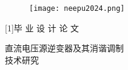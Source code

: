 \begin{center}

    \begin{figure}[h]
        \centering
        \vspace{2.6\baselineskip}
        \texttt{[image: neepu2024.png]}
    \end{figure}
    \vspace{0.27em}    
    {\scalebox{0.96}[1]{\fontsize{38pt}{0}\heiti \hspace{-5pt}毕 \hspace{5pt} 业 \hspace{5pt} 设 \hspace{5pt} 计 \hspace{5pt} 论 \hspace{5pt} 文\hspace{5pt} }}  \\  %
    \vspace{2.9em}

    {\heiti
    
    直流电压源逆变器及其消谐调制\\[0.8em] 技术研究    
    }%

\end{center}
\thispagestyle{empty}
\vspace{7.2\baselineskip}






